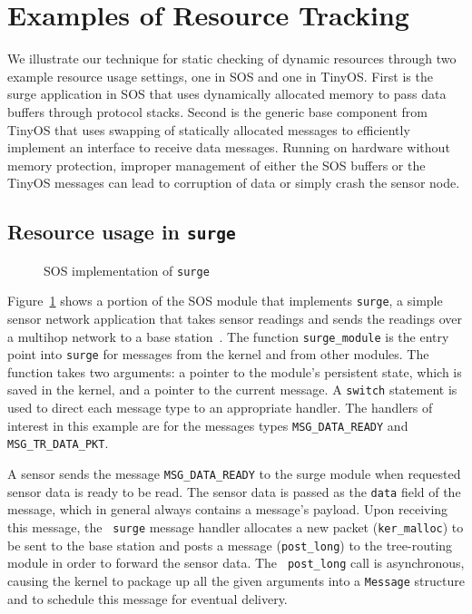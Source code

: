 \section{Examples of Resource Tracking}
\label{sec:example}

We illustrate our technique for static checking of dynamic resources
through two example resource usage settings, one in SOS and one in TinyOS.  
First is the surge application in
SOS that uses dynamically allocated memory to pass data buffers through
protocol stacks.  Second is the generic base component from TinyOS
that uses swapping of statically allocated messages to efficiently
implement an interface to receive data messages.  Running on hardware
without memory protection, improper management of either the SOS
buffers or the TinyOS messages can lead to corruption of data or
simply crash the sensor node.

%
%


\subsection{Resource usage in {\tt surge}}

\begin{figure}[t]

\caption{SOS implementation of {\tt surge}\label{fig:surge}}
\end{figure}

Figure~\ref{fig:surge} shows a portion of the SOS module that
implements {\tt surge}, a simple sensor network application that takes
sensor readings and sends the readings over a multihop network to a
base station~\cite{nesC}.  The function {\tt surge\_module} is the
entry point into {\tt surge} for messages from the kernel and from
other modules.  The function takes two arguments: a pointer to the
module's persistent state, which is saved in the kernel, and a pointer
to the current message.  A {\tt switch} statement is used to direct
each message type to an appropriate handler.  The handlers of interest
in this example are for the messages types {\tt MSG\_DATA\_READY} and
{\tt MSG\_TR\_DATA\_PKT}.

A sensor sends the message {\tt MSG\_DATA\_READY} to the surge module
when requested sensor data is ready to be read. The sensor data is
passed as the {\tt data} field of the message, which in general always
contains a message's payload.  Upon receiving this message, the {\tt
surge} message handler allocates a new packet ({\tt ker\_malloc}) to
be sent to the base station and posts a message ({\tt post\_long}) to
the tree-routing module in order to forward the sensor data.  The {\tt
post\_long} call is asynchronous, causing the kernel to package up all
the given arguments into a {\tt Message} structure and to schedule
this message for eventual delivery.

